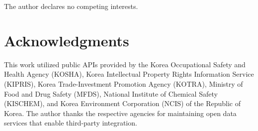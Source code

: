 \documentclass[preprint,12pt]{elsarticle}
\begin{document}
The author declares no competing interests.

\section*{Acknowledgments}

This work utilized public APIs provided by the Korea Occupational Safety and Health Agency (KOSHA), Korea Intellectual Property Rights Information Service (KIPRIS), Korea Trade-Investment Promotion Agency (KOTRA), Ministry of Food and Drug Safety (MFDS), National Institute of Chemical Safety (KISCHEM), and Korea Environment Corporation (NCIS) of the Republic of Korea.
The author thanks the respective agencies for maintaining open data services that enable third-party integration.

\end{document}

